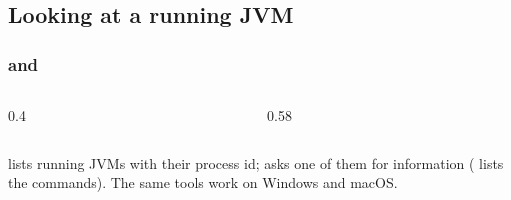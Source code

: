 \documentclass[aspectratio=169,10pt,compress]{beamer}
\begin{document}
\subsection[Monitoring]{Looking at a running JVM}




\begin{frame}[t,fragile] \frametitle{ and }
  \begin{columns}[T]
    \begin{column}{0.4\textwidth}
    \end{column}
    \begin{column}{0.58\textwidth}
    \end{column}
  \end{columns}

  \vspace{0.1em}
  \small {} lists running JVMs with their process id;  asks
  one of them for information ( lists the commands). The same tools work on Windows and macOS.
\end{frame}

\end{document}
